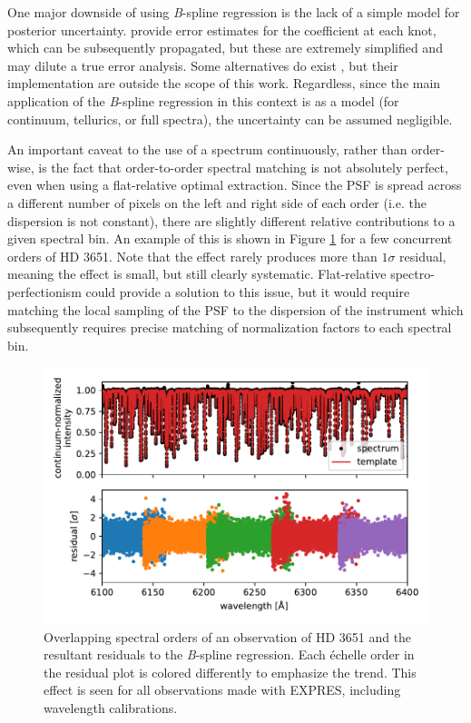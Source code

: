 One major downside of using \textit{B}-spline regression is the lack of a simple model for posterior uncertainty. \citet{zechmeister_spectrum_2018} provide error estimates for the coefficient at each knot, which can be subsequently propagated, but these are extremely simplified and may dilute a true error analysis. Some alternatives do exist \citep{enting_propagating_2006, gardner_uncertainties_2003}, but their implementation are outside the scope of this work. Regardless, since the main application of the \textit{B}-spline regression in this context is as a model (for continuum, tellurics, or full spectra), the uncertainty can be assumed negligible.

An important caveat to the use of a spectrum continuously, rather than order-wise, is the fact that order-to-order spectral matching is not absolutely perfect, even when using a flat-relative optimal extraction. Since the PSF is spread across a different number of pixels on the left and right side of each order (i.e. the dispersion is not constant), there are slightly different relative contributions to a given spectral bin. An example of this is shown in Figure \ref{fig:order-matching} for a few concurrent orders of HD 3651. Note that the effect rarely produces more than $1\sigma$ residual, meaning the effect is small, but still clearly systematic. Flat-relative spectro-perfectionism could provide a solution to this issue, but it would require matching the local sampling of the PSF to the dispersion of the instrument which subsequently requires precise matching of normalization factors to each spectral bin.

\begin{figure}
    \centering
    \includegraphics{figures-5/order-matching.pdf}
    \caption{Overlapping spectral orders of an observation of HD 3651 and the resultant residuals to the \textit{B}-spline regression. Each \'{e}chelle order in the residual plot is colored differently to emphasize the trend. This effect is seen for all observations made with EXPRES, including wavelength calibrations.}
    \label{fig:order-matching}
\end{figure}

